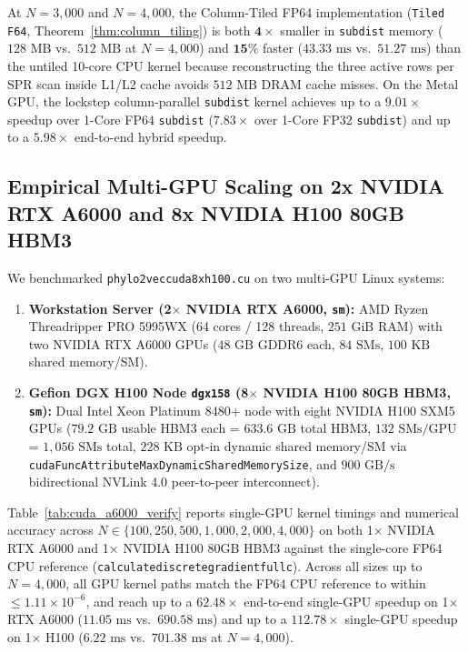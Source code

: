 \documentclass[11pt,a4paper]{article}
\makeatletter
\DeclareRobustCommand{\_}{\ifmmode\nfss@text{\textunderscore}\else\textunderscore\allowbreak\fi}
\theoremstyle{definition}
\makeatother
\begin{document}
At $N = 3{,}000$ and $N = 4{,}000$, the Column-Tiled FP64 implementation (\texttt{Tiled F64}, Theorem~\ref{thm:column_tiling}) is both $\mathbf{4\times}$ smaller in \texttt{subdist} memory ($128\text{ MB}$ vs.\ $512\text{ MB}$ at $N=4{,}000$) and $\mathbf{15\%}$ faster ($43.33\text{ ms}$ vs.\ $51.27\text{ ms}$) than the untiled 10-core CPU kernel because reconstructing the three active rows per SPR scan inside L1/L2 cache avoids $512\text{ MB}$ DRAM cache misses. On the Metal GPU, the lockstep column-parallel \texttt{subdist} kernel achieves up to a $\mathbf{9.01\times}$ speedup over 1-Core FP64 \texttt{subdist} ($\mathbf{7.83\times}$ over 1-Core FP32 \texttt{subdist}) and up to a $\mathbf{5.98\times}$ end-to-end hybrid speedup.

\subsection{Empirical Multi-GPU Scaling on 2x NVIDIA RTX A6000 and 8x NVIDIA H100 80GB HBM3}
We benchmarked \texttt{phylo2vec\_cuda\_8xh100.cu} on two multi-GPU Linux systems:
\begin{enumerate}
    \item \textbf{Workstation Server (2$\times$ NVIDIA RTX A6000, \texttt{sm\_86}):} AMD Ryzen Threadripper PRO 5995WX (64 cores / 128 threads, $251\text{ GiB}$ RAM) with two NVIDIA RTX A6000 GPUs ($48\text{ GB}$ GDDR6 each, $84\text{ SMs}$, $100\text{ KB}$ shared memory/SM).
    \item \textbf{Gefion DGX H100 Node \texttt{dgx158} (8$\times$ NVIDIA H100 80GB HBM3, \texttt{sm\_90}):} Dual Intel Xeon Platinum 8480+ node with eight NVIDIA H100 SXM5 GPUs ($79.2\text{ GB}$ usable HBM3 each = $633.6\text{ GB}$ total HBM3, $132\text{ SMs/GPU}$ = $1{,}056\text{ SMs}$ total, $228\text{ KB}$ opt-in dynamic shared memory/SM via \texttt{cudaFuncAttributeMaxDynamicSharedMemorySize}, and $900\text{ GB/s}$ bidirectional NVLink 4.0 peer-to-peer interconnect).
\end{enumerate}

Table~\ref{tab:cuda_a6000_verify} reports single-GPU kernel timings and numerical accuracy across $N \in \{100, 250, 500, 1{,}000, 2{,}000, 4{,}000\}$ on both 1$\times$ NVIDIA RTX A6000 and 1$\times$ NVIDIA H100 80GB HBM3 against the single-core FP64 CPU reference (\texttt{calculate\_discrete\_gradient\_full\_c}). Across all sizes up to $N = 4{,}000$, all GPU kernel paths match the FP64 CPU reference to within $\le 1.11 \times 10^{-6}$, and reach up to a $\mathbf{62.48\times}$ end-to-end single-GPU speedup on 1$\times$ RTX A6000 ($11.05\text{ ms}$ vs.\ $690.58\text{ ms}$) and up to a $\mathbf{112.78\times}$ single-GPU speedup on 1$\times$ H100 ($6.22\text{ ms}$ vs.\ $701.38\text{ ms}$ at $N = 4{,}000$).
\end{document}
